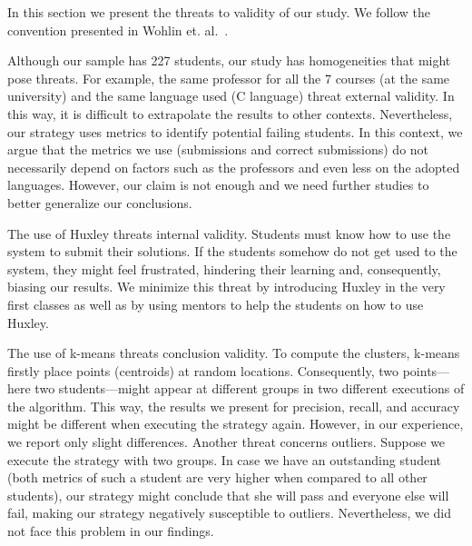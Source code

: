 In this section we present the threats to validity of our study. We follow the convention presented in Wohlin et. al.~\cite{claes-experimentation-se}.

Although our sample has 227 students, our study has homogeneities that might pose threats. For example, the same professor for all the 7 courses (at the same university) and the same language used (C language) threat external validity. In this way, it is difficult to extrapolate the results to other contexts. Nevertheless, our strategy uses metrics to identify potential failing students. In this context, we argue that the metrics we use (submissions and correct submissions) do not necessarily depend on factors such as the professors and even less on the adopted languages. However, our claim is not enough and we need further studies to better generalize our conclusions.

The use of Huxley threats internal validity. Students must know how to use the system to submit their solutions. If the students somehow do not get used to the system, they might feel frustrated, hindering their learning and, consequently, biasing our results. We minimize this threat by introducing Huxley in the very first classes as well as by using mentors to help the students on how to use Huxley.

The use of k-means threats conclusion validity. To compute the clusters, k-means firstly place points (centroids) at random locations. Consequently, two points---here two students---might appear at different groups in two different executions of the algorithm. This way, the results we present for precision, recall, and accuracy might be different when executing the strategy again. However, in our experience, we report only slight differences. Another threat concerns outliers. Suppose we execute the strategy with two groups. In case we have an outstanding student (both metrics of such a student are very higher when compared to all other students), our strategy might conclude that she will pass and everyone else will fail, making our strategy negatively susceptible to outliers. Nevertheless, we did not face this problem in our findings.




